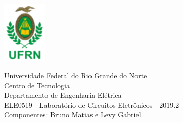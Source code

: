 \documentclass[12pt]{article}
\newcommand{\hoofding}[6]{ 
\begin{flushleft}
\includegraphics[height=3cm]{ufrn.png} 
\end{flushleft}
\vspace{-3.3cm} 
\hspace{3cm} 
\parbox{10cm}{#1\\#2\\#3\\#4\\#5\\#6} 
\vspace{-0.6cm}
\hspace{1cm}   

{\parindent=0pt \hrulefill} 
\vspace{0mm}}
\begin{document}
\hoofding {Universidade Federal do Rio Grande do Norte}{Centro de Tecnologia}{Departamento de Engenharia Elétrica}{ELE0519 - Laboratório de Circuitos Eletrônicos - 2019.2}{Componentes: Bruno Matias e Levy Gabriel}

\onehalfspacing 


\end{document}
